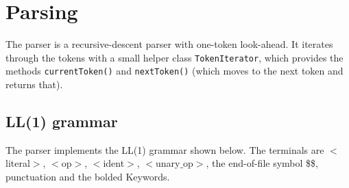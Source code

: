 \documentclass[a4paper]{article}
\newcommand*{\code}[1]{\texttt{#1}}
\begin{document}
\section{Parsing}

The parser is a recursive-descent parser with one-token look-ahead.
It iterates through the tokens with a small helper class 
\code{TokenIterator}, which provides the methods \code{currentToken()} 
and \code{nextToken()} (which moves to the next token and returns that).

\subsection{LL(1) grammar}


\newcommand{\cfgvar}[1]{$<$#1$>$}
\newcommand{\cfgrule}[2]{\text{\cfgvar{#1}} &\rightarrow \text{#2}}
\newcommand{\cfgterm}[1]{\textbf{#1}}
The parser implements the LL(1) grammar shown below.
The terminals are \cfgvar{literal}, \cfgvar{op}, \cfgvar{ident}, 
\cfgvar{unary$\_$op}, the end-of-file symbol \$\$, punctuation 
and the bolded Keywords.
\end{document}
